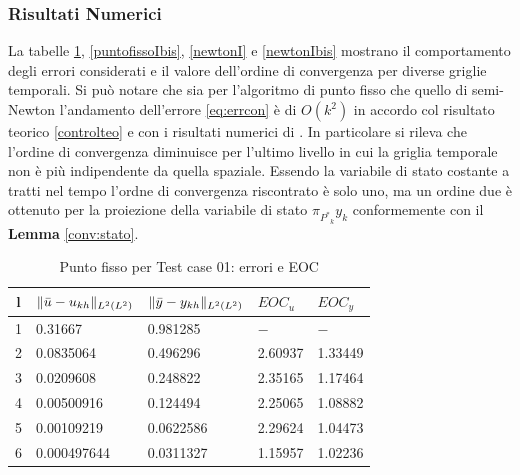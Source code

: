 \subsubsection{Risultati Numerici}
La tabelle \ref{puntofissoI}, \ref{puntofissoIbis}, \ref{newtonI} e \ref{newtonIbis} mostrano il comportamento degli errori considerati e il valore dell'ordine di convergenza per diverse griglie temporali. Si può notare che sia per l'algoritmo di punto fisso che quello di semi-Newton l'andamento dell'errore \ref{eq:errcon} è di $O(k^2)$ in accordo col risultato teorico \ref{controlteo} e con i risultati numerici di \cite{MAIN}. In particolare si rileva che l'ordine di convergenza diminuisce per l'ultimo livello in cui la griglia temporale non è più indipendente da quella spaziale. Essendo la variabile di stato costante a tratti nel tempo l'ordne di convergenza riscontrato è solo uno, ma un ordine due è ottenuto per la proiezione della variabile di stato $\pi_{{P^*}_k}y_k$ conformemente con il \textbf{Lemma} \ref{conv:stato}.

\begin{table}
\caption{Punto fisso per Test case 01: errori e EOC }
\label{puntofissoI}
\centering

\begin{tabular}{cllll}
\toprule
{l}           &  {$ \lVert\bar{u}-u_{kh}\rVert_{L^2(L^2)} $} &  {$ \lVert\bar{y}-y_{kh}\rVert_{L^2(L^2)} $} &  {$ EOC_u $} &  {$ EOC_y $} \\
\midrule
1            &  0.31667 &  0.981285 &  {$-$} &  {$-$} \\
2            &  0.0835064 &  0.496296 &  2.60937 &  1.33449 \\
3            &  0.0209608 &  0.248822 &  2.35165 &  1.17464 \\
4            &  0.00500916 &  0.124494 &  2.25065 &  1.08882 \\
5            &  0.00109219  &  0.0622586 &  2.29624 &  1.04473 \\
6            &  0.000497644 &  0.0311327 &  1.15957 &  1.02236 \\
\bottomrule
\end{tabular}              

\end{table}


